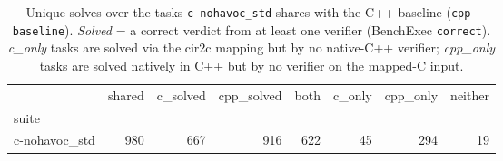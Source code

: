 \begin{table}[t]
  \centering
  \caption{Unique solves over the tasks \texttt{c-nohavoc_std} shares with the C++ baseline (\texttt{cpp-baseline}). \emph{Solved} = a correct verdict from at least one verifier (BenchExec \texttt{correct}). \emph{c\_only} tasks are solved via the cir2c mapping but by no native-C++ verifier; \emph{cpp\_only} tasks are solved natively in C++ but by no verifier on the mapped-C input.}
  \label{tab:unique-solves}
\begin{tabular}{lrrrrrrr}
\toprule
 & shared & c\_solved & cpp\_solved & both & c\_only & cpp\_only & neither \\
suite &  &  &  &  &  &  &  \\
\midrule
c-nohavoc\_std & 980 & 667 & 916 & 622 & 45 & 294 & 19 \\
\bottomrule
\end{tabular}
\end{table}
